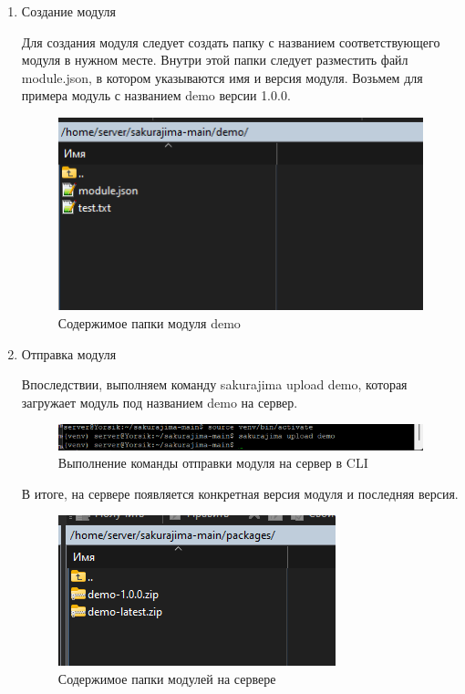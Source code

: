\begin{enumerate}

\item Создание модуля

Для создания модуля следует создать папку с названием соответствующего модуля в нужном месте. Внутри этой папки следует разместить файл module.json, в котором указываются имя и версия модуля. Возьмем для примера модуль с названием demo версии 1.0.0.

\begin{figure}
  \centering
  \includegraphics[width=.6\textwidth]{graphics/test/demo_r.png}
  \caption{Содержимое папки модуля demo}
  \label{fig:test1}
\end{figure}
\newpage
    \item Отправка модуля

Впоследствии, выполняем команду sakurajima upload demo, которая загружает модуль под названием demo на сервер.

\begin{figure}
  \centering
  \includegraphics[width=1.0\textwidth]{graphics/test/demo.png}
  \caption{Выполнение команды отправки модуля на сервер в CLI}
  \label{fig:test1}
\end{figure}

В итоге, на сервере появляется конкретная версия модуля и последняя версия.

\begin{figure}
  \centering
  \includegraphics[width=.7\textwidth]{graphics/test/demo_alias_modules.png}
  \caption{Содержимое папки модулей на сервере}
  \label{fig:test1}
\end{figure}


\end{enumerate}
